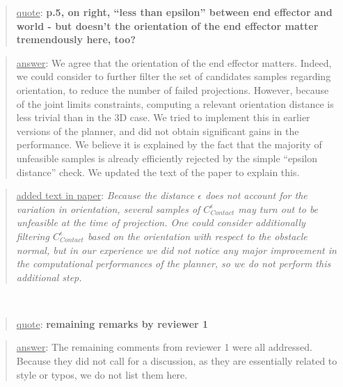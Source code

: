 \documentclass[a4paper]{article}
\newcommand{\done}[0]{}
\newcommand\quot[1]{\begin{quote} \underline{quote}: \textbf{#1}\end{quote}}
\newcommand\as[1]{\begin{quote} \underline{answer}: {#1}\end{quote} }
\newcommand\qt[1]{\begin{quote} \underline{added text in paper}: \textit{#1}\end{quote} \leavevmode \\ }
\begin{document}
\quot{p.5, on right, ``less than epsilon'' between end effector and world - but doesn’t the orientation of the end effector matter tremendously here, too?}
\as{
We agree that the orientation of the end effector matters. Indeed, we could consider to further filter the set of candidates samples regarding orientation, to reduce the number of failed
projections. However, because of the joint limits constraints, computing a relevant orientation distance is less trivial than in the 3D case. We tried to implement this
in earlier versions of the planner, and did not obtain significant gains in the performance. We believe it is explained by the fact that the majority of unfeasible samples is already
efficiently rejected by the simple ``epsilon distance'' check. We updated the text of the paper to explain this.
}
\qt{Because the distance $\epsilon$ does not account for the variation in orientation, several samples of $ C_{Contact}^{\epsilon}$  may turn out to be unfeasible at the time of projection. One could consider additionally filtering $ C_{Contact}^{\epsilon}$ based on the orientation with respect to the obstacle normal, but in our experience we did not notice
any major improvement in the computational performances of the planner, so we do not perform this additional step. }
\done

\quot{remaining remarks by reviewer 1}
\as{The remaining comments from reviewer 1 were all addressed. Because they did not call for a discussion, as they are essentially related to style or typos, we do not list them here.}\done
\end{document}
